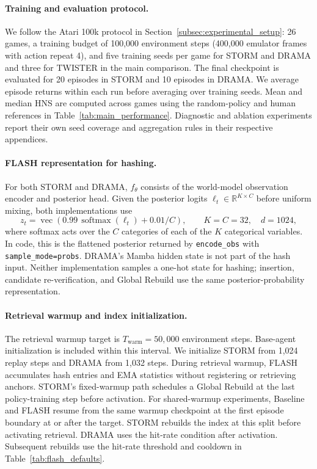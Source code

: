 \documentclass{article} %
\begin{document}
\paragraph{Training and evaluation protocol.}
We follow the Atari 100k protocol in Section~\ref{subsec:experimental_setup}: 26 games, a training budget of 100,000 environment steps (400,000 emulator frames with action repeat 4), and five training seeds per game for STORM and DRAMA and three for TWISTER in the main comparison. The final checkpoint is evaluated for 20 episodes in STORM and 10 episodes in DRAMA. We average episode returns within each run before averaging over training seeds. Mean and median HNS are computed across games using the random-policy and human references in Table~\ref{tab:main_performance}. Diagnostic and ablation experiments report their own seed coverage and aggregation rules in their respective appendices.

\paragraph{FLASH representation for hashing.}
For both STORM and DRAMA, $f_\theta$ consists of the world-model observation encoder and posterior head. Given the posterior logits $\ell_t\in\mathbb{R}^{K\times C}$ before uniform mixing, both implementations use
\begin{equation}
z_t=\operatorname{vec}\!\left(0.99\,\operatorname{softmax}(\ell_t)+0.01/C\right),
\qquad K=C=32,\quad d=1024,
\label{eq:appendix_hash_representation}
\end{equation}
where softmax acts over the $C$ categories of each of the $K$ categorical variables. In code, this is the flattened posterior returned by \texttt{encode\_obs} with \texttt{sample\_mode=probs}. DRAMA's Mamba hidden state is not part of the hash input. Neither implementation samples a one-hot state for hashing; insertion, candidate re-verification, and Global Rebuild use the same posterior-probability representation.

\paragraph{Retrieval warmup and index initialization.}
The retrieval warmup target is $T_{\mathrm{warm}} = 50{,}000$ environment steps. Base-agent initialization is included within this interval. We initialize STORM from 1,024 replay steps and DRAMA from 1,032 steps. During retrieval warmup, FLASH accumulates hash entries and EMA statistics without registering or retrieving anchors. STORM's fixed-warmup path schedules a Global Rebuild at the last policy-training step before activation. For shared-warmup experiments, Baseline and FLASH resume from the same warmup checkpoint at the first episode boundary at or after the target. STORM rebuilds the index at this split before activating retrieval.
DRAMA uses the hit-rate condition after activation. Subsequent rebuilds use the hit-rate threshold and cooldown in Table~\ref{tab:flash_defaults}.
\end{document}
